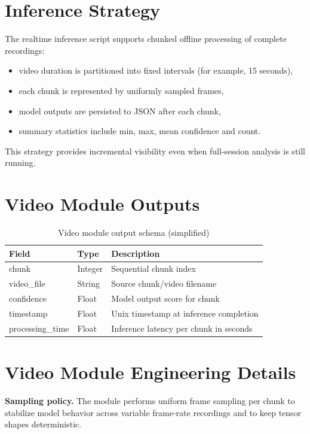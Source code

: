 \documentclass[12pt,a4paper]{report}
\begin{document}
\section{Inference Strategy}
The realtime inference script supports chunked offline processing of complete recordings:
\begin{itemize}[leftmargin=1.5em]
\item video duration is partitioned into fixed intervals (for example, 15 seconds),
\item each chunk is represented by uniformly sampled frames,
\item model outputs are persisted to JSON after each chunk,
\item summary statistics include min, max, mean confidence and count.
\end{itemize}

This strategy provides incremental visibility even when full-session analysis is still running.

\section{Video Module Outputs}
\begin{table}[H]
\centering
\caption{Video module output schema (simplified)}
\begin{tabularx}{\textwidth}{>{\raggedright\arraybackslash}p{3.2cm} >{\raggedright\arraybackslash}p{2.5cm} Y}
\toprule
\textbf{Field} & \textbf{Type} & \textbf{Description} \\
\midrule
chunk & Integer & Sequential chunk index \\
video\_file & String & Source chunk/video filename \\
confidence & Float & Model output score for chunk \\
timestamp & Float & Unix timestamp at inference completion \\
processing\_time & Float & Inference latency per chunk in seconds \\
\bottomrule
\end{tabularx}
\end{table}

\section{Video Module Engineering Details}
\textbf{Sampling policy.} The module performs uniform frame sampling per chunk to stabilize model behavior across variable frame-rate recordings and to keep tensor shapes deterministic.
\end{document}
